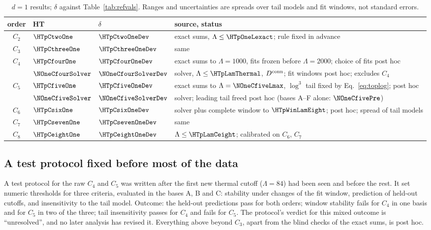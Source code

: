 \begin{table}[ht]
\centering\footnotesize\renewcommand{\arraystretch}{1.25}
\begin{tabular}{@{}cllp{6.5cm}@{}}
\toprule
order & HT & $\delta$ & source, status \\
\midrule
$C_2$ & $\HTpCtwoOne$ & $\HTpCtwoOneDev$ & exact sums, $\Lambda\le\HTpOneLexact$; rule fixed in advance \\
$C_3$ & $\HTpCthreeOne$ & $\HTpCthreeOneDev$ & same \\
$C_4$ & $\HTpCfourOne$ & $\HTpCfourOneDev$ & exact sums to $\Lambda=1000$, fits frozen before $\Lambda=2000$; choice of fits post hoc \\
 & $\NOneCfourSolver$ & $\NOneCfourSolverDev$ & solver, $\Lambda\le\HTpLamThermal$, $D^{\rm conn}$; fit windows post hoc; excludes $C_4$ \\
$C_5$ & $\HTpCfiveOne$ & $\HTpCfiveOneDev$ & exact sums to $\Lambda=\NOneCfiveLmax$, $\log^3$ tail fixed by Eq.~\eqref{eq:toplog}; post hoc \\
 & $\NOneCfiveSolver$ & $\NOneCfiveSolverDev$ & solver; leading tail freed post hoc (bases A--F alone: $\NOneCfivePre$) \\
$C_6$ & $\HTpCsixOne$ & $\HTpCsixOneDev$ & solver plus complete window to $\HTpWinLamEight$; post hoc; spread of tail models \\
$C_7$ & $\HTpCsevenOne$ & $\HTpCsevenOneDev$ & same \\
$C_8$ & $\HTpCeightOne$ & $\HTpCeightOneDev$ & $\Lambda\le\HTpLamCeight$; calibrated on $C_6$, $C_7$ \\
\bottomrule
\end{tabular}
\caption{$d=1$ results; $\delta$ against Table~\ref{tab:refvals}. Ranges and uncertainties are spreads over tail
models and fit windows, not standard errors.}
\label{d1:tab:results}
\end{table}

\subsection{A test protocol fixed before most of the data}
A test protocol for the raw $C_4$ and $C_5$ was written after the first new thermal cutoff ($\Lambda=84$) had been seen
and before the rest. It set numeric thresholds for three criteria, evaluated in the bases A, B and C: stability under
changes of the fit window, prediction of held-out cutoffs, and insensitivity to the tail model. Outcome: the held-out
predictions pass for both orders; window stability fails for $C_4$ in one basis and for $C_5$ in two of the three; tail
insensitivity passes for $C_4$ and fails for $C_5$. The protocol's verdict for this mixed outcome is
``unresolved'', and no later analysis has revised it. Everything above beyond $C_3$, apart from the blind checks of the
exact sums, is post hoc.

